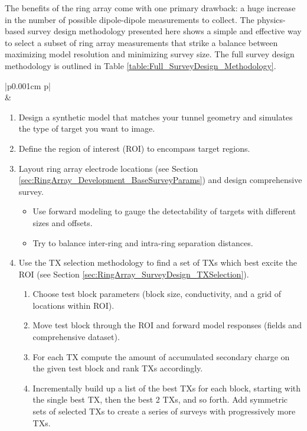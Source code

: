 \documentclass[preprint,authoryear,12pt]{elsarticle}
\begin{document}
The benefits of the ring array come with one primary drawback: a huge increase in the number of possible dipole-dipole measurements to collect. The physics-based survey design methodology presented here shows a simple and effective way to select a subset of ring array measurements that strike a balance between maximizing model resolution and minimizing survey size. The full survey design methodology is outlined in Table \ref{table:Full_SurveyDesign_Methodology}.

\begin{table}
   \scriptsize
   \begin{tabular} {|p{0.001cm} p{\linewidth}|}
      \hline
       \\
       &
         \begin{enumerate}[leftmargin=*]
            \item Design a synthetic model that matches your tunnel geometry and simulates the type of target you want to image.
            \item Define the region of interest (ROI) to encompass target regions.
            \item Layout ring array electrode locations (see Section \ref{sec:RingArray_Development_BaseSurveyParams}) and design comprehensive survey.
            \begin{itemize}
               \item Use forward modeling to gauge the detectability of targets with different sizes and offsets.
               \item Try to balance inter-ring and intra-ring separation distances.
            \end{itemize}
            \item Use the TX selection methodology to find a set of TXs which best excite the ROI (see Section \ref{sec:RingArray_SurveyDesign_TXSelection}).
               \begin{enumerate}
                  \item Choose test block parameters (block size, conductivity, and a grid of locations within ROI).
                  \item Move test block through the ROI and forward model responses (fields and comprehensive dataset).
                  \item For each TX compute the amount of accumulated secondary charge on the given test block and rank TXs accordingly.
                  \item Incrementally build up a list of the best TXs for each block, starting with the single best TX, then the best 2 TXs, and so forth. Add symmetric sets of selected TXs to create a series of surveys with progressively more TXs.

\end{enumerate}
\end{enumerate}
\end{tabular}
\end{table}
\end{document}
